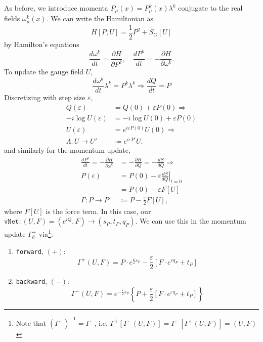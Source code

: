 \documentclass[a4paper,11pt]{article}
\begin{document}
As before, we introduce momenta $P_{\mu}(x) = P^{k}_{\mu}(x) \lambda^{k}$ conjugate to the real fields $\omega_{\mu}^{k}(x)$.
%
We can write the Hamiltonian as
%
\begin{equation}
    H[P, U] = \frac{1}{2} P^{2} + S_{G}[U]
\end{equation}
%
by Hamilton's equations
%
\begin{equation}
\frac{d\omega^{k}}{dt} = \frac{\partial H}{\partial P^{k}},
\quad \frac{dP^{k}}{dt} = - \frac{\partial H}{\partial \omega^{k}}.
\end{equation}
%
To update the gauge field $U$,
%
\begin{equation}
    \frac{d\omega^{k}}{dt}\lambda^{k} = P^{k} \lambda^{k} \Rightarrow \frac{dQ}{dt} = P
\end{equation}
%
Discretizing with step size $\varepsilon$,
%
\begin{align}
    Q(\varepsilon) &= Q(0) + \varepsilon P(0) \Rightarrow \\
    -i \log U(\varepsilon) &= - i \log U(0) + \varepsilon P(0) \\
    U(\varepsilon) &= e^{i \varepsilon P(0)} U(0) \Longrightarrow \\
    \Lambda: U \rightarrow U' &\coloneqq e^{i\varepsilon P'} U.
\end{align}
%
and similarly for the momentum update,
%
\begin{align}
    \frac{dP^{k}}{dt} = - \frac{\partial H}{\partial \omega^{k}} &= - \frac{\partial H}{\partial Q} = - \frac{dS}{dQ} \Rightarrow \\
    P(\varepsilon) &= P(0) - \varepsilon \left.\frac{dS}{dQ}\right|_{t=0} \\
    &= P(0) - \varepsilon F[U] \\
    \Gamma: P \rightarrow P' &\coloneqq P - \frac{\varepsilon}{2} F[U],
\end{align}
%
where $F[U]$ is the force term.
%
In this case, our $\texttt{vNet}: (U, F) = (e^{iQ}, F) \rightarrow (s_{P}, t_{P}, q_{P})$.
%
We can use this in the momentum update $\Gamma^{\pm}_{\theta}$ via\footnote{Note that $\left(\Gamma^{+}\right)^{-1} = \Gamma^{-}$, i.e. $\Gamma^{+}\left[\Gamma^{-}(U, F)\right] = \Gamma^{-}\left[\Gamma^{+}(U, F)\right] = (U, F)$}:
%
\begin{enumerate}
    \item \texttt{forward}, $(+)$:
    \begin{equation}
        \Gamma^{+}(U, F) = P \cdot e^{\frac{\varepsilon}{2} s_{P}} - \frac{\varepsilon}{2}\left[ F \cdot e^{\varepsilon q_{P}} + t_{P} \right]
    \end{equation}
    \item \texttt{backward}, $(-)$:
    \begin{equation}
        \Gamma^{-}(U, F) = e^{-\frac{\varepsilon}{2} s_{P}} \left\{P + \frac{\varepsilon}{2} \left[ F \cdot e^{\varepsilon q_{P}} + t_{P} \right] \right\}
    \end{equation}
\end{enumerate}
\end{document}
